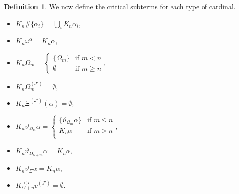 \documentclass[11pt]{amsart}
\theoremstyle{definition}
\newtheorem{definition}[theorem]{Definition}
\begin{document}
\begin{definition}
We now define the critical subterms for each type of cardinal.
  
  \begin{itemize}
  \item $K_n\#\{\alpha_i\}=\bigcup_i K_n\alpha_i$,
  \item $K_n\omega^\alpha=K_n\alpha$,
  \item $K_n\Omega_m=\left\{\begin{array}{ll}
                              \{\Omega_m\}&\text{if }m<n\\
                              \emptyset&\text{if }m\geq n
                              \end{array}\right.$,
  \item $K_n\Omega^{(J')}_m=\emptyset$,
  \item $K_n\Xi^{(J')}(\alpha)=\emptyset$,
  \item $K_n\vartheta_{\Omega_m}\alpha=\left\{\begin{array}{ll}
                                                \{\vartheta_{\Omega_m}\alpha\}&\text{if }m\leq n\\
                                                K_n\alpha&\text{if }m>n\\
                                              \end{array}\right.$,
  \item $K_n\vartheta_{\Omega_{\Omega+m}}\alpha=K_n\alpha$,
  \item $K_n\vartheta_\Xi\alpha=K_n\alpha$,
  \item $K^{<c}_{\Omega+n} v^{(J')}=\emptyset$.
 \end{itemize}


\end{definition}
\end{document}
